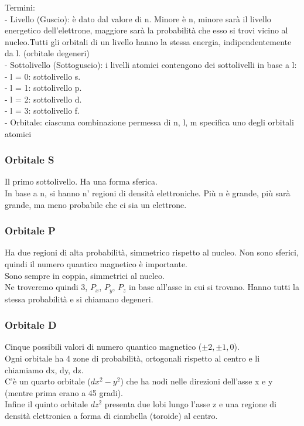 Termini:\\
\tab- Livello (Guscio): è dato dal valore di n. Minore è n, minore sarà il livello energetico dell’elettrone, maggiore sarà la probabilità che esso si trovi vicino al nucleo.Tutti gli orbitali di un livello hanno la stessa energia, indipendentemente da l. (orbitale degeneri)\\
\tab- Sottolivello (Sottoguscio): i livelli atomici contengono dei sottolivelli in base a l:\\
\tab\tab- l = 0: sottolivello s.\\
\tab\tab- l = 1: sottolivello p.\\
\tab\tab- l = 2: sottolivello d.\\
\tab\tab- l = 3: sottolivello f.\\
\tab- Orbitale: ciascuna combinazione permessa di n, l, m specifica uno degli orbitali atomici
\subsubsection{Orbitale S}
Il primo sottolivello. Ha una forma sferica.\\
In base a n, si hanno n' regioni di densità elettroniche. Più n è grande, più sarà grande, ma meno probabile che ci sia un elettrone.
\subsubsection{Orbitale P}
Ha due regioni di alta probabilità, simmetrico rispetto al nucleo. Non sono sferici, quindi il numero quantico magnetico è importante.\\
Sono sempre in coppia, simmetrici al nucleo.\\
Ne troveremo quindi 3, $P_x$, $P_y$, $P_z$ in base all'asse in cui si trovano. Hanno tutti la stessa probabilità e si chiamano degeneri.
\subsubsection{Orbitale D}
Cinque possibili valori di numero quantico magnetico ($\pm 2, \pm 1, 0$).\\
Ogni orbitale ha 4 zone di probabilità, ortogonali rispetto al centro e li chiamiamo dx, dy, dz.\\
C'è un quarto orbitale ($dx^2-y^2$) che ha nodi nelle direzioni dell'asse x e y (mentre prima erano a 45 gradi).\\
Infine il quinto orbitale $dz^2$ presenta due lobi lungo l'asse z e una regione di densità elettronica a forma di ciambella (toroide) al centro.
